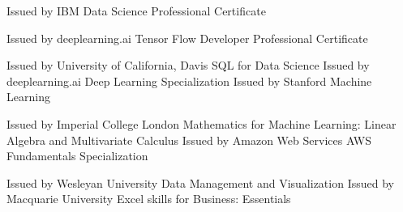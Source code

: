 


\begin{cventries}


\cventry
{Issued by IBM} %
{Data Science Professional Certificate} %
{} %
{} %
{ %
}


\cventry
{Issued by deeplearning.ai} %
{Tensor Flow Developer Professional Certificate} %
{} %
{} %
{}

\cventry
{Issued by University of California, Davis} %
{SQL for Data Science} %
{} %
{} %
{ }
\cventry
{Issued by deeplearning.ai} %
{Deep Learning Specialization} %
{} %
{} %
{ }
\cventry
{Issued by Stanford} %
{Machine Learning} %
{} %
{} %
{
}

\cventry
{Issued by Imperial College London} %
{Mathematics for Machine Learning: Linear Algebra and Multivariate Calculus} %
{} %
{} %
{}
\cventry
{Issued by Amazon Web Services} %
{AWS Fundamentals Specialization} %
{} %
{} %
{
}

\cventry
{Issued by Wesleyan University} %
{Data Management and Visualization} %
{} %
{} %
{}
\cventry
{Issued by Macquarie University} %
{Excel skills for Business: Essentials} %
{} %
{} %
{
}
\end{cventries}
